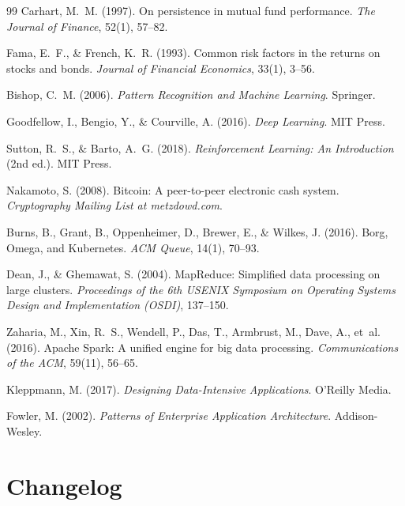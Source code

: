 \documentclass[12pt,openany]{book}
\numberwithin{equation}{chapter}
\theoremstyle{plain}
\theoremstyle{definition}
\theoremstyle{remark}
\begin{document}
\begin{thebibliography}{99}
Carhart, M.~M. (1997).
On persistence in mutual fund performance.
\textit{The Journal of Finance}, 52(1), 57--82.

Fama, E.~F., \& French, K.~R. (1993).
Common risk factors in the returns on stocks and bonds.
\textit{Journal of Financial Economics}, 33(1), 3--56.

Bishop, C.~M. (2006).
\textit{Pattern Recognition and Machine Learning}.
Springer.

Goodfellow, I., Bengio, Y., \& Courville, A. (2016).
\textit{Deep Learning}.
MIT Press.

Sutton, R.~S., \& Barto, A.~G. (2018).
\textit{Reinforcement Learning: An Introduction} (2nd ed.).
MIT Press.

Nakamoto, S. (2008).
Bitcoin: A peer-to-peer electronic cash system.
\textit{Cryptography Mailing List at metzdowd.com}.

Burns, B., Grant, B., Oppenheimer, D., Brewer, E., \& Wilkes, J. (2016).
Borg, Omega, and Kubernetes.
\textit{ACM Queue}, 14(1), 70--93.

Dean, J., \& Ghemawat, S. (2004).
MapReduce: Simplified data processing on large clusters.
\textit{Proceedings of the 6th USENIX Symposium on Operating Systems Design and Implementation (OSDI)}, 137--150.

Zaharia, M., Xin, R.~S., Wendell, P., Das, T., Armbrust, M., Dave, A., et~al. (2016).
Apache Spark: A unified engine for big data processing.
\textit{Communications of the ACM}, 59(11), 56--65.

Kleppmann, M. (2017).
\textit{Designing Data-Intensive Applications}.
O'Reilly Media.

Fowler, M. (2002).
\textit{Patterns of Enterprise Application Architecture}.
Addison-Wesley.

\end{thebibliography}



\chapter*{Changelog}
\end{document}
